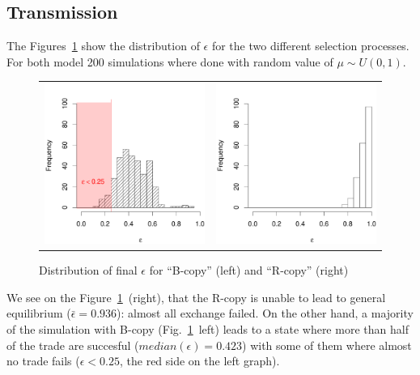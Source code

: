\documentclass[a1paper,fontscale=.49]{baposter}
\begin{document}
\begin{poster}
{    \subsection*{Transmission}
		\vspace{-.1cm}
    The Figures~\ref{fig:epsilon} show the distribution of $\epsilon$ for the two different selection processes. For both model 200 simulations where done with random value of $\mu \sim U(0,1)$. 
	\vspace{-.75cm}
\begin{figure}[H]
    \center
	\begin{tabular}{cc}
		\includegraphics[width=.4\textwidth]{img/trade.pdf}&
		\includegraphics[width=.4\textwidth]{img/rand.pdf} \\
	\end{tabular}
	\vspace{-.5cm}
	\caption{
	    \small
	    Distribution of final $\epsilon$ for ``B-copy'' (left) and ``R-copy'' (right)
	}
	\label{fig:epsilon}
\end{figure}
We see on the Figure~\ref{fig:epsilon}~(right), that the R-copy is unable to lead to general equilibrium ($\bar{\epsilon} = 0.936$): almost all exchange failed. On the other hand, a majority of the simulation with B-copy (Fig.~\ref{fig:epsilon}~left) leads to a state where more than half of the trade are succesful ($median(\epsilon)=0.423$) with some of them where almost no trade fails ($\epsilon < 0.25$, the red side on the left graph).

}
\end{poster}
\end{document}
